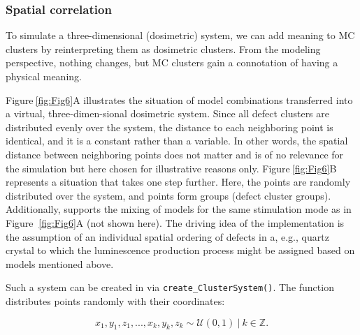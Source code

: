 \hypertarget{spatial-correlation}{%
\subsubsection{Spatial correlation}\label{spatial-correlation}}

To simulate a three-dimensional (dosimetric) system, we can add meaning
to MC clusters by reinterpreting them as dosimetric clusters. From the
modeling perspective, nothing changes, but MC clusters gain a
connotation of having a physical meaning.

Figure\(~\)\ref{fig:Fig6}A illustrates the situation of model
combinations transferred into a virtual, three-dimen-sional dosimetric
system. Since all defect clusters are distributed evenly over the
system, the distance to each neighboring point is identical, and it is
a constant rather than a variable. In other words, the spatial distance
between neighboring points does not matter and is of no relevance for
the simulation but here chosen for illustrative reasons only.
Figure\(~\)\ref{fig:Fig6}B represents a situation that takes one step
further. Here, the points are randomly distributed over the system, and
points form groups (defect cluster groups). Additionally,
 supports the mixing of models for the same stimulation
mode as in Figure\(~\) \ref{fig:Fig6}A (not shown here). The driving
idea of the implementation is the assumption of an individual spatial
ordering of defects in a, e.g., quartz crystal to which the luminescence
production process might be assigned based on models mentioned above.

Such a system can be created in  via
\texttt{create\_ClusterSystem()}. The function distributes points
randomly with their coordinates:

\begin{equation}
x_1,y_1,z_1,...,x_k,y_k,z_k \sim \mathcal{U}(0,1)~\mathtt{|}~k \in \mathbb{Z}.
\end{equation}


